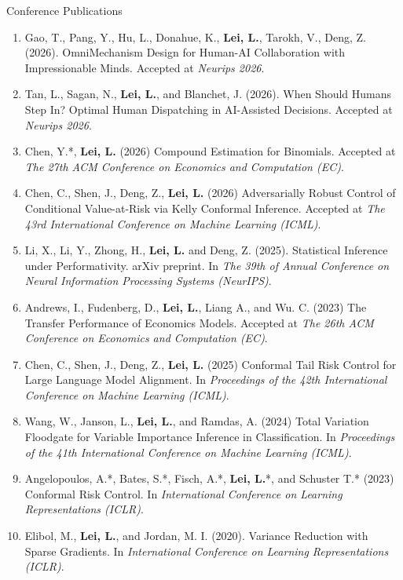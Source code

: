 \documentclass{article}
\begin{document}
\begin{large}
\noindent Conference Publications
\end{large}

\begin{enumerate}
\item Gao, T., Pang, Y., Hu, L., Donahue, K., \textbf{Lei, L.}, Tarokh, V., Deng, Z. (2026). OmniMechanism Design for Human-AI Collaboration with Impressionable Minds. Accepted at \emph{Neurips 2026}.
\item Tan, L., Sagan, N., \textbf{Lei, L.}, and Blanchet, J. (2026). When Should Humans Step In? Optimal Human Dispatching in AI-Assisted Decisions. Accepted at \emph{Neurips 2026}.
\item Chen, Y.*, \textbf{Lei, L.} (2026) Compound Estimation for Binomials. Accepted at \emph{The 27th ACM Conference on Economics and Computation (EC)}.
\item Chen, C., Shen, J., Deng, Z., \textbf{Lei, L.} (2026) Adversarially Robust Control of Conditional Value-at-Risk via Kelly Conformal Inference. Accepted at \emph{The 43rd International Conference on Machine Learning (ICML)}.
\item Li, X., Li, Y., Zhong, H., \textbf{Lei, L.} and Deng, Z. (2025). Statistical Inference under Performativity. arXiv preprint. In \emph{The 39th of Annual Conference on Neural Information Processing Systems (NeurIPS)}.
\item Andrews, I., Fudenberg, D., \textbf{Lei, L.}, Liang A., and Wu. C. (2023) The Transfer Performance of Economics Models. Accepted at \emph{The 26th ACM Conference on Economics and Computation (EC)}.
\item Chen, C., Shen, J., Deng, Z., \textbf{Lei, L.} (2025) Conformal Tail Risk Control for Large Language Model Alignment. In \emph{Proceedings of the 42th International Conference on Machine Learning (ICML)}.
\item Wang, W., Janson, L., \textbf{Lei, L.}, and Ramdas, A. (2024) Total Variation Floodgate for Variable Importance Inference in Classification. In \emph{Proceedings of the 41th International Conference on Machine Learning (ICML)}.
\item Angelopoulos, A.*, Bates, S.*, Fisch, A.*, \textbf{Lei, L.}*, and Schuster T.* (2023) Conformal Risk Control. In \emph{International Conference on Learning Representations (ICLR)}.
\item Elibol, M., \textbf{Lei, L.}, and Jordan, M. I. (2020). Variance Reduction with Sparse Gradients. In \emph{International Conference on Learning Representations (ICLR)}.

\end{enumerate}
\end{document}
